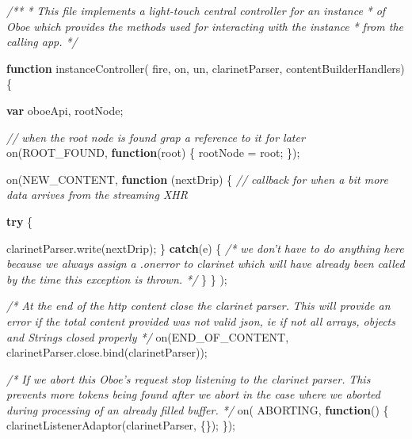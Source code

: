 \documentclass[]{article}
\newenvironment{Shaded}{}{}
\newcommand{\KeywordTok}[1]{\textcolor[rgb]{0.00,0.44,0.13}{\textbf{{#1}}}}
\newcommand{\CommentTok}[1]{\textcolor[rgb]{0.38,0.63,0.69}{\textit{{#1}}}}
\newcommand{\OtherTok}[1]{\textcolor[rgb]{0.00,0.44,0.13}{{#1}}}
\newcommand{\FunctionTok}[1]{\textcolor[rgb]{0.02,0.16,0.49}{{#1}}}
\newcommand{\NormalTok}[1]{{#1}}
\begin{document}
\begin{Shaded}
\begin{Highlighting}[]
\CommentTok{/**}
\CommentTok{ * This file implements a light-touch central controller for an instance }
\CommentTok{ * of Oboe which provides the methods used for interacting with the instance }
\CommentTok{ * from the calling app.}
\CommentTok{ */}
 
 
\KeywordTok{function} \FunctionTok{instanceController}\NormalTok{(  fire, on, un, }
                              \NormalTok{clarinetParser, contentBuilderHandlers) \{}
  
   \KeywordTok{var} \NormalTok{oboeApi, rootNode;}

   \CommentTok{// when the root node is found grap a reference to it for later      }
   \FunctionTok{on}\NormalTok{(ROOT_FOUND, }\KeywordTok{function}\NormalTok{(root) \{}
      \NormalTok{rootNode = root;   }
   \NormalTok{\});}
                              
   \FunctionTok{on}\NormalTok{(NEW_CONTENT,         }
      \KeywordTok{function} \NormalTok{(nextDrip) \{}
         \CommentTok{// callback for when a bit more data arrives from the streaming XHR         }
          
         \KeywordTok{try} \NormalTok{\{}
            
            \OtherTok{clarinetParser}\NormalTok{.}\FunctionTok{write}\NormalTok{(nextDrip);            }
         \NormalTok{\} }\KeywordTok{catch}\NormalTok{(e) \{ }
            \CommentTok{/* we don't have to do anything here because we always assign}
\CommentTok{               a .onerror to clarinet which will have already been called }
\CommentTok{               by the time this exception is thrown. */}                
         \NormalTok{\}}
      \NormalTok{\}}
   \NormalTok{);}
   
   \CommentTok{/* At the end of the http content close the clarinet parser.}
\CommentTok{      This will provide an error if the total content provided was not }
\CommentTok{      valid json, ie if not all arrays, objects and Strings closed properly */}
   \FunctionTok{on}\NormalTok{(END_OF_CONTENT, }\OtherTok{clarinetParser}\NormalTok{.}\OtherTok{close}\NormalTok{.}\FunctionTok{bind}\NormalTok{(clarinetParser));}
   

   \CommentTok{/* If we abort this Oboe's request stop listening to the clarinet parser. }
\CommentTok{      This prevents more tokens being found after we abort in the case where }
\CommentTok{      we aborted during processing of an already filled buffer. */}
   \FunctionTok{on}\NormalTok{( ABORTING, }\KeywordTok{function}\NormalTok{() \{}
      \FunctionTok{clarinetListenerAdaptor}\NormalTok{(clarinetParser, \{\});}
   \NormalTok{\});   }


\end{Highlighting}
\end{Shaded}
\end{document}
